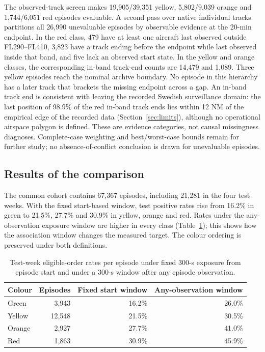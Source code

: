 \documentclass[pdflatex,sn-mathphys-num]{sn-jnl}
\begin{document}
The observed-track screen makes 19,905/39,351 yellow, 5,802/9,039 orange and 1,744/6,051 red episodes evaluable. A second pass over native individual tracks partitions all 26,990 unevaluable episodes by observable evidence at the 20-min endpoint. In the red class, 479 have at least one aircraft last observed outside FL290--FL410, 3,823 have a track ending before the endpoint while last observed inside that band, and five lack an observed start state. In the yellow and orange classes, the corresponding in-band track-end counts are 14,479 and 1,089. Three yellow episodes reach the nominal archive boundary. No episode in this hierarchy has a later track that brackets the missing endpoint across a gap. An in-band track end is consistent with leaving the recorded Swedish surveillance domain: the last position of 98.9\% of the red in-band track ends lies within 12 NM of the empirical edge of the recorded data (Section~\ref{sec:limits}), although no operational airspace polygon is defined. These are evidence categories, not causal missingness diagnoses. Complete-case weighting and best/worst-case bounds remain for further study; no absence-of-conflict conclusion is drawn for unevaluable episodes.

\subsection{Results of the comparison}
The common cohort contains 67,367 episodes, including 21,281 in the four test weeks. With the fixed start-based window, test positive rates rise from 16.2\% in green to 21.5\%, 27.7\% and 30.9\% in yellow, orange and red. Rates under the any-observation exposure window are higher in every class (Table~\ref{tab:windows}); this shows how the association window changes the measured target. The colour ordering is preserved under both definitions.

\begin{table}[t]
\caption{Test-week eligible-order rates per episode under fixed 300-s exposure from episode start and under a 300-s window after any episode observation.}\label{tab:windows}
\begin{tabular}{@{}lrrr@{}}\toprule
Colour & Episodes & Fixed start window & Any-observation window\\\midrule
Green & 3,943 & 16.2\% & 26.0\%\\
Yellow & 12,548 & 21.5\% & 30.5\%\\
Orange & 2,927 & 27.7\% & 41.0\%\\
Red & 1,863 & 30.9\% & 45.9\%\\\bottomrule
\end{tabular}
\end{table}
\end{document}
